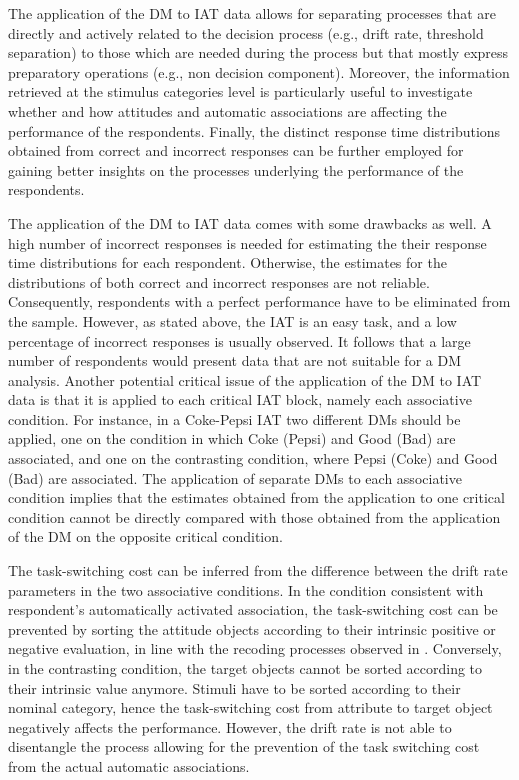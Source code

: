 \documentclass[12pt]{book}
\begin{document}
The application of the DM to IAT data allows for separating processes that are directly and actively related to the decision process (e.g., drift rate, threshold separation) to those which are needed during the process but that mostly express preparatory operations (e.g., non decision component). 
Moreover, the information retrieved at the stimulus categories level is particularly useful to investigate whether and how attitudes and automatic associations are affecting the performance of the respondents. 
Finally, the distinct response time distributions obtained from correct and incorrect responses can be further employed for gaining better insights on the processes underlying the performance of the respondents.

The application of the DM to IAT data comes with some drawbacks as well. 
A high number of incorrect responses is needed for estimating the their response time distributions for each respondent.  
Otherwise, the estimates for the distributions of both correct and incorrect responses are not reliable. 
Consequently, respondents with a perfect performance have to be eliminated from the sample.
However, as stated above, the IAT is an easy task, and a low percentage of incorrect responses is usually observed. It follows that a large number of respondents would present data that are not suitable for a DM analysis. 
Another potential critical issue of the application of the DM to IAT data is that it is applied to each critical IAT block, namely each associative condition. 
For instance, in a Coke-Pepsi IAT two different DMs should be applied, one on the condition in which Coke (Pepsi) and Good (Bad) are associated, and one on the contrasting condition, where Pepsi (Coke) and Good (Bad) are associated.
The application of separate DMs to each associative condition implies that the estimates obtained from the application to one critical condition cannot be directly compared with those obtained from the application of the DM on the opposite critical condition.

The task-switching cost can be inferred from the difference between the drift rate parameters in the two associative conditions. 
In the condition consistent with respondent's automatically activated association, the task-switching cost can be prevented by sorting the attitude objects according to their intrinsic positive or negative evaluation, in line with the recoding processes observed in . 
Conversely, in the contrasting condition, the target objects cannot be sorted according to their intrinsic value anymore. Stimuli have to be sorted according to their nominal category, hence the task-switching cost from attribute to target object negatively affects the performance.
However, the drift rate is not able to disentangle the process allowing for the prevention of the task switching cost from the actual automatic associations.
\end{document}
